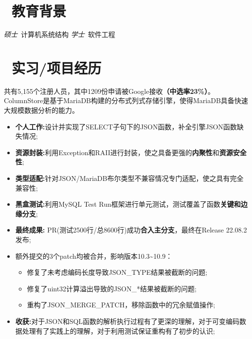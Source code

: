 \documentclass{resume}
\begin{document}



\section{\faGraduationCap\  教育背景}
\textit{硕士}\ 计算机系统结构
\datedsubsection{\textbf{东北大学}, 沈阳, 辽宁}{2017 -- 2021}
\textit{学士}\ 软件工程

\section{\faUsers\ 实习/项目经历}
共有5,155个注册人员，其中1209份申请被Google接收\textbf{（中选率23\%）}。ColumnStore是基于MariaDB构建的分布式列式存储引擎，使得MariaDB具备快速大规模数据分析的能力。
\begin{itemize}[parsep=0.3ex]
  \item \textbf{个人工作:}设计并实现了SELECT子句下的JSON函数，补全引擎JSON函数缺失情况;
  \item \textbf{资源封装:}利用Exception和RAII进行封装，使之具备更强的\textbf{内聚性}和\textbf{资源安全性};
  \item \textbf{类型适配:}针对JSON/MariaDB布尔类型不兼容情况专门适配，使之具有完全兼容性;
  \item \textbf{黑盒测试:}利用MySQL Test Run框架进行单元测试，测试覆盖了函数\textbf{关键和边缘分支};
  \item \textbf{最终成果:} PR(测试2500行/总8600行)成功\textbf{合入主分支}，最终在Release 22.08.2发布;\enspace{}
  \item 额外提交的3个patch均被合并，影响版本10.3\textasciitilde 10.9：
        \begin{itemize}
          \item 修复了未考虑编码长度导致JSON\_TYPE结果被截断的问题;\enspace{}
          \item 修复了uint32计算溢出导致的JSON\_*结果被截断的问题;\enspace{}
          \item 重构了JSON\_MERGE\_PATCH，移除函数中的冗余赋值操作;\enspace{}
        \end{itemize}
  \item \textbf{收获:}对于JSON和SQL函数的解析执行过程有了更深的理解，对于可变编码数据处理有了实践上的理解，对于利用测试保证重构有了初步的认识;
\end{itemize}
\end{document}

